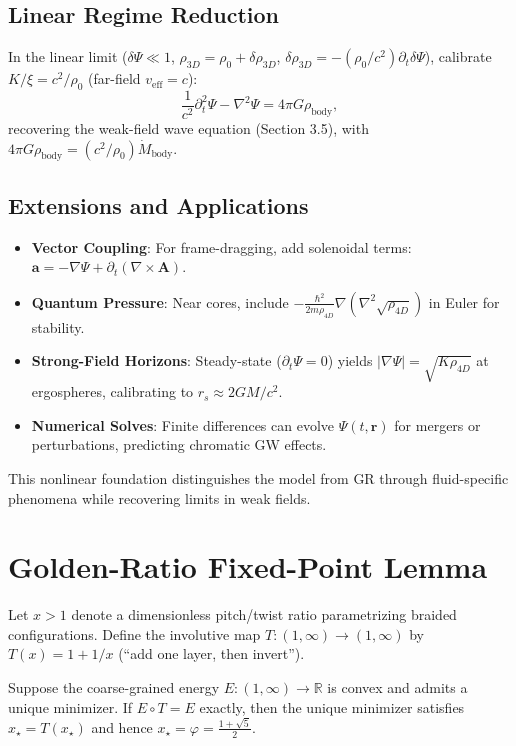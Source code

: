 \subsection{Linear Regime Reduction}

In the linear limit ($\delta \Psi \ll 1$, $\rho_{3D} = \rho_0 + \delta \rho_{3D}$, $\delta \rho_{3D} = -(\rho_0 / c^2) \partial_t \delta \Psi$), calibrate $K / \xi = c^2 / \rho_0$ (far-field $v_{\text{eff}} = c$):
\[
\frac{1}{c^2} \partial_t^2 \Psi - \nabla^2 \Psi = 4\pi G \rho_{\text{body}},
\]
recovering the weak-field wave equation (Section 3.5), with $4\pi G \rho_{\text{body}} = (c^2 / \rho_0) \dot{M}_{\text{body}}$.

\subsection{Extensions and Applications}

\begin{itemize}
\item \textbf{Vector Coupling}: For frame-dragging, add solenoidal terms: $\mathbf{a} = -\nabla \Psi + \partial_t (\nabla \times \mathbf{A})$.
\item \textbf{Quantum Pressure}: Near cores, include $-\frac{\hbar^2}{2m \rho_{4D}} \nabla (\nabla^2 \sqrt{\rho_{4D}})$ in Euler for stability.
\item \textbf{Strong-Field Horizons}: Steady-state ($\partial_t \Psi = 0$) yields $|\nabla \Psi| = \sqrt{K \rho_{4D}}$ at ergospheres, calibrating to $r_s \approx 2GM/c^2$.
\item \textbf{Numerical Solves}: Finite differences can evolve $\Psi(t,\mathbf{r})$ for mergers or perturbations, predicting chromatic GW effects.
\end{itemize}

This nonlinear foundation distinguishes the model from GR through fluid-specific phenomena while recovering limits in weak fields.


\section{Golden-Ratio Fixed-Point Lemma}\label{app:phi-fixed-point}

Let $x>1$ denote a dimensionless pitch/twist ratio parametrizing braided configurations.
Define the involutive map $T:(1,\infty)\to(1,\infty)$ by $T(x)=1+1/x$ (``add one layer, then invert'').

\begin{lemma}
Suppose the coarse-grained energy $E:(1,\infty)\to\mathbb{R}$ is convex and admits a unique minimizer.
If $E\circ T = E$ exactly, then the unique minimizer satisfies $x_\star = T(x_\star)$ and hence $x_\star=\varphi=\frac{1+\sqrt{5}}{2}$.
\end{lemma}

